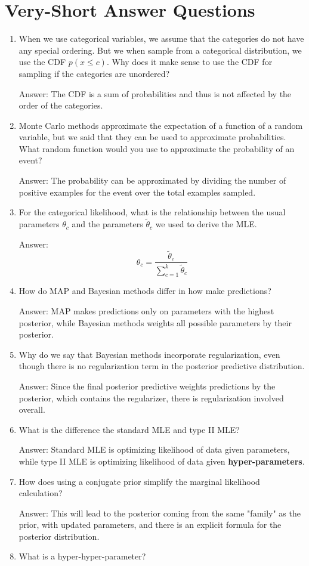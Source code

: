 \documentclass{article}
\def\ans#1{\par\gre{Answer: #1}}
\def\gre#1{{\color{gre}#1}}
\def\enum#1{\begin{enumerate}#1\end{enumerate}}
\begin{document}
\pagebreak


\section{Very-Short Answer Questions}


\enum{
\item When we use categorical variables, we assume that the categories do not have any special ordering. But we when sample from a categorical distribution, we use the CDF $p(x \leq c)$. Why does it make sense to use the CDF for sampling if the categories are unordered?
\ans{
The CDF is a sum of probabilities and thus is not affected by the order of the categories.
}
\item Monte Carlo methods approximate the expectation of a function of a random variable, but we said that they can be used to approximate probabilities. What random function would you use to approximate the probability of an event?
\ans{
The probability can be approximated by dividing the number of positive examples for the event over the total examples sampled.
}
\item For the categorical likelihood, what is the relationship between the usual parameters $\theta_c$ and the parameters $\tilde{\theta}_c$ we used to derive the MLE.
\ans{
\[\theta_c=\frac{\tilde{\theta}_c}{\sum_{c=1}^k \tilde{\theta}_c}\]
}
\item How do MAP and Bayesian methods differ in how make predictions?
\ans{
MAP makes predictions only on parameters with the highest posterior, while Bayesian methods weights all possible parameters by their posterior.
}
\item Why do we say that Bayesian methods incorporate regularization, even though there is no regularization term in the posterior predictive distribution.
\ans{
Since the final posterior predictive weights predictions by the posterior, which contains the regularizer, there is regularization involved overall.
}
\pagebreak
\item What is the difference the standard MLE and type II MLE?
\ans{
Standard MLE is optimizing likelihood of data given parameters, while type II MLE is optimizing likelihood of data given \textbf{hyper-parameters}.
}
\item How does using a conjugate prior simplify the marginal likelihood calculation?
\ans{
This will lead to the posterior coming from the same "family" as the prior, with updated parameters, and there is an explicit formula for the posterior distribution.
}
\item What is a hyper-hyper-parameter?
}
\end{document}
